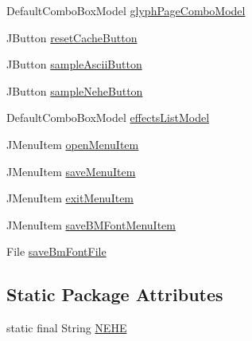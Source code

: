 \begin{DoxyCompactItemize}
\item 
Default\+Combo\+Box\+Model \mbox{\hyperlink{classorg_1_1newdawn_1_1slick_1_1tools_1_1hiero_1_1_hiero_a8c372704d7cad96c8bfb7254bbbf9fe4}{glyph\+Page\+Combo\+Model}}
\item 
J\+Button \mbox{\hyperlink{classorg_1_1newdawn_1_1slick_1_1tools_1_1hiero_1_1_hiero_a82573cb24c97cc1e0abe7b5578da0e36}{reset\+Cache\+Button}}
\item 
J\+Button \mbox{\hyperlink{classorg_1_1newdawn_1_1slick_1_1tools_1_1hiero_1_1_hiero_ac1e290018d3b30ebf449fa59c44f0b65}{sample\+Ascii\+Button}}
\item 
J\+Button \mbox{\hyperlink{classorg_1_1newdawn_1_1slick_1_1tools_1_1hiero_1_1_hiero_a52c15e38f26347d1de7fc7ae6c87804f}{sample\+Nehe\+Button}}
\item 
Default\+Combo\+Box\+Model \mbox{\hyperlink{classorg_1_1newdawn_1_1slick_1_1tools_1_1hiero_1_1_hiero_ace6d63639e4675334744afbdad439e98}{effects\+List\+Model}}
\item 
J\+Menu\+Item \mbox{\hyperlink{classorg_1_1newdawn_1_1slick_1_1tools_1_1hiero_1_1_hiero_afd5b856520d9a369e33589a7ba546e4b}{open\+Menu\+Item}}
\item 
J\+Menu\+Item \mbox{\hyperlink{classorg_1_1newdawn_1_1slick_1_1tools_1_1hiero_1_1_hiero_a718e4dc3618321c479640f1444da4964}{save\+Menu\+Item}}
\item 
J\+Menu\+Item \mbox{\hyperlink{classorg_1_1newdawn_1_1slick_1_1tools_1_1hiero_1_1_hiero_a679b649a97e021351d32b9491e7f135a}{exit\+Menu\+Item}}
\item 
J\+Menu\+Item \mbox{\hyperlink{classorg_1_1newdawn_1_1slick_1_1tools_1_1hiero_1_1_hiero_a5591ce9dfc64eb4e3512ac22813e6a42}{save\+B\+M\+Font\+Menu\+Item}}
\item 
File \mbox{\hyperlink{classorg_1_1newdawn_1_1slick_1_1tools_1_1hiero_1_1_hiero_a91a948679db9a82ae3a8e25e377967be}{save\+Bm\+Font\+File}}
\end{DoxyCompactItemize}
\subsection*{Static Package Attributes}
\begin{DoxyCompactItemize}
\item 
static final String \mbox{\hyperlink{classorg_1_1newdawn_1_1slick_1_1tools_1_1hiero_1_1_hiero_a2c9ead1c4d97e5cf07c383baf8ca6467}{N\+E\+HE}}
\end{DoxyCompactItemize}
